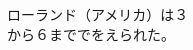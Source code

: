 \documentclass[10pt,b5j]{tarticle} %
\begin{document}
\begin{enumerate}
\begin{minipage}[c]{\blocksize}
        
        \vspace{\linespace}
        \item
        ローランド（アメリカ）は３\\
        から６まででをえられた。
    
    \end{minipage}
\end{enumerate} %
\end{document}
